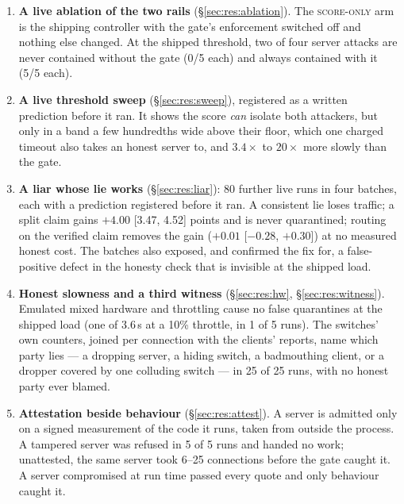 \documentclass[10pt,twocolumn,letterpaper]{article}
\newcommand{\armscore}{\textsc{score-only}}
\begin{document}
\begin{enumerate}[leftmargin=1.2em,itemsep=2pt,topsep=2pt]
\item \textbf{A live ablation of the two rails}
  (\S\ref{sec:res:ablation}). The \armscore{} arm is the shipping controller
  with the gate's enforcement switched off and nothing else changed. At the
  shipped threshold, two of four server attacks are never contained without the
  gate (0/5 each) and always contained with it (5/5 each).

\item \textbf{A live threshold sweep} (\S\ref{sec:res:sweep}), registered as a
  written prediction before it ran. It shows the score \emph{can} isolate both
  attackers, but only in a band a few hundredths wide above their floor, which
  one charged timeout also takes an honest server to, and $3.4\times$ to
  $20\times$ more slowly than the gate.

\item \textbf{A liar whose lie works} (\S\ref{sec:res:liar}): 80 further live
  runs in four batches, each with a prediction registered before it ran. A
  consistent lie loses traffic; a split claim gains $+4.00$ [3.47, 4.52]
  points and is never quarantined; routing on the verified claim removes the
  gain ($+0.01$ [$-0.28$, $+0.30$]) at no measured honest cost. The batches
  also exposed, and confirmed the fix for, a false-positive defect in the
  honesty check that is invisible at the shipped load.

\item \textbf{Honest slowness and a third witness} (\S\ref{sec:res:hw},
  \S\ref{sec:res:witness}). Emulated mixed hardware and throttling cause no
  false quarantines at the shipped load (one of 3.6\,s at a 10\% throttle, in
  1 of 5 runs). The switches' own counters, joined per connection with the
  clients' reports, name which party lies --- a dropping server, a hiding
  switch, a badmouthing client, or a dropper covered by one colluding switch
  --- in 25 of 25 runs, with no honest party ever blamed.

\item \textbf{Attestation beside behaviour} (\S\ref{sec:res:attest}). A
  server is admitted only on a signed measurement of the code it runs, taken
  from outside the process. A tampered server was refused in 5 of 5 runs and
  handed no work; unattested, the same server took 6--25 connections before
  the gate caught it. A server compromised at run time passed every quote and
  only behaviour caught it.


\end{enumerate}
\end{document}
